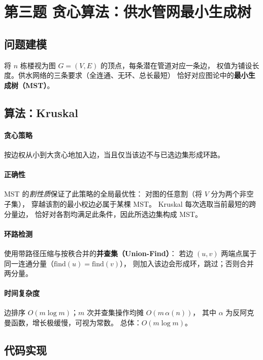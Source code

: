 \documentclass[12pt, a4paper]{ctexart}
\begin{document}
\section{第三题 \; 贪心算法：供水管网最小生成树}

\subsection{问题建模}

将 $n$ 栋楼视为图 $G=(V, E)$ 的顶点，每条潜在管道对应一条边，
权值为铺设长度。供水网络的三条要求（全连通、无环、总长最短）
恰好对应图论中的\textbf{最小生成树（MST）}。

\subsection{算法：Kruskal}

\paragraph{贪心策略}
按边权从小到大贪心地加入边，当且仅当该边不与已选边集形成环路。

\paragraph{正确性}
MST 的\emph{割性质}保证了此策略的全局最优性：
对图的任意割（将 $V$ 分为两个非空子集），
穿越该割的最小权边必属于某棵 MST。
Kruskal 每次选取当前最短的跨分量边，
恰好对各割均满足此条件，因此所选边集构成 MST。

\paragraph{环路检测}
使用带路径压缩与按秩合并的\textbf{并查集（Union-Find）}：
若边 $(u,v)$ 两端点属于同一连通分量（$\mathrm{find}(u) = \mathrm{find}(v)$），
则加入该边会形成环，跳过；否则合并两分量。

\paragraph{时间复杂度}
边排序 $O(m \log m)$；$m$ 次并查集操作均摊 $O(m\, \alpha(n))$，
其中 $\alpha$ 为反阿克曼函数，增长极缓慢，可视为常数。
总体：$O(m \log m)$。

\subsection{代码实现}
\end{document}

